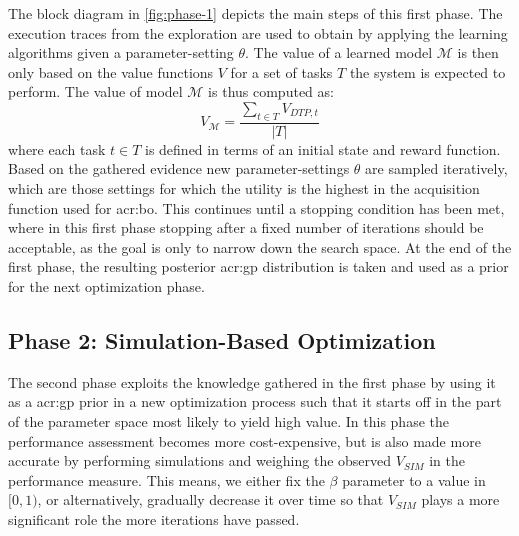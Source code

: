 The block diagram in \autoref{fig:phase-1} depicts the main steps of this first phase. The execution traces from the exploration are used to obtain  by applying the learning algorithms given a parameter-setting $\theta$.
The value of a learned model $\mathcal{M}$ is then only based on the value functions $V$ for a set of tasks $T$ the system is expected to perform.
The value of model $\mathcal{M}$ is thus computed as:
\begin{equation} 
V_{\mathcal{M}} = \frac{\sum_{t \in T} V_{\mathit{DTP}, t}}{|T|}
\end{equation}
where each task $t \in T$ is defined in terms of an initial state and reward function.
Based on the gathered evidence new parameter-settings $\theta$ are sampled iteratively, which are those settings for which the utility is the highest in the acquisition function used for \acrshort{acr:bo}.
This continues until a stopping condition has been met, where in this first phase stopping after a fixed number of iterations should be acceptable, as the goal is only to narrow down the search space.
At the end of the first phase, the resulting posterior \acrshort{acr:gp} distribution is taken and used as a prior for the next optimization phase.





\subsection{Phase 2: Simulation-Based Optimization}
\label{sec:phase-2}

The second phase exploits the knowledge gathered in the first phase by using it as a \acrshort{acr:gp} prior in a new optimization process such that it starts off in the part of the parameter space most likely to yield high value.
In this phase the performance assessment becomes more cost-expensive, but is also made more accurate by performing simulations and weighing the observed $V_\mathit{SIM}$ in the performance measure.
This means, we either fix the $\beta$ parameter to a value in $[0, 1)$, or alternatively, gradually decrease it over time so that $V_\mathit{SIM}$ plays a more significant role the more iterations have passed.

